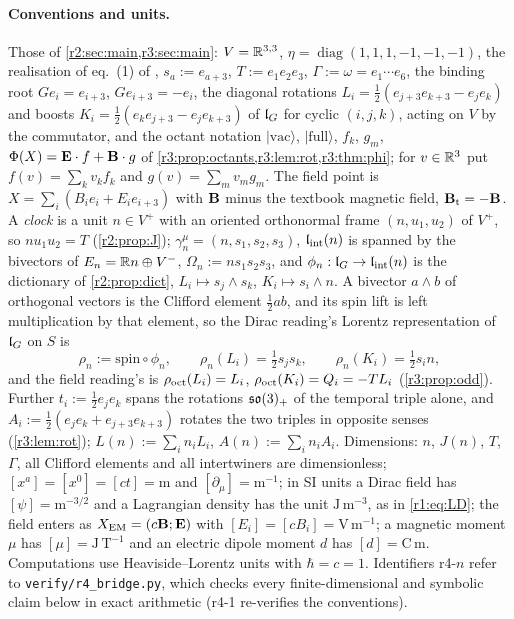 \paragraph{Conventions and units.} Those of \cref{r2:sec:main,r3:sec:main}: $V=\mathbb{R}^{3,3}$, $\eta=\operatorname{diag}(1,1,1,-1,-1,-1)$, the
realisation of eq.~(1) of \cite{ES17}, $s_a:=e_{a+3}$, $T:=e_1e_2e_3$, $\Gamma:=\omega=e_1\cdots e_6$, the binding root $Ge_i=e_{i+3}$,
$Ge_{i+3}=-e_i$, the diagonal rotations $L_i=\tfrac12(e_{j+3}e_{k+3}-e_je_k)$ and boosts $K_i=\tfrac12(e_ke_{j+3}-e_je_{k+3})$ of $\mathfrak l_G$ for cyclic
$(i,j,k)$, acting on $V$ by the commutator, and the octant notation $|\mathrm{vac}\rangle$, $|\mathrm{full}\rangle$, $f_k$, $g_m$, $\Phi(X)=\mathbf E\cdot f+\mathbf B\cdot g$ of
\cref{r3:prop:octants,r3:lem:rot,r3:thm:phi}; for $v\in\mathbb{R}^3$ put $f(v)=\sum_kv_kf_k$ and $g(v)=\sum_mv_mg_m$. The field point is
$X=\sum_i(B_ie_i+E_ie_{i+3})$ with $\mathbf B$ minus the textbook magnetic field, $\mathbf B_{\rm t}=-\mathbf B$. A \emph{clock} is a unit $n\in V^+$ with an oriented
orthonormal frame $(n,u_1,u_2)$ of $V^+$, so $nu_1u_2=T$ (\cref{r2:prop:J}); $\gamma^\mu_n=(n,s_1,s_2,s_3)$, $\mathfrak l_{\rm int}(n)$ is spanned by the
bivectors of $E_n=\mathbb{R} n\oplus V^-$, $\Omega_n:=ns_1s_2s_3$, and $\phi_n:\mathfrak l_G\to\mathfrak l_{\rm int}(n)$ is the dictionary of \cref{r2:prop:dict},
$L_i\mapsto s_j\wedge s_k$, $K_i\mapsto s_i\wedge n$. A bivector $a\wedge b$ of orthogonal vectors is the Clifford element $\tfrac12ab$, and its spin
lift is left multiplication by that element, so the Dirac reading's Lorentz representation of $\mathfrak l_G$ on $S$ is
\[
\rho_n:=\text{spin}\circ\phi_n,\qquad \rho_n(L_i)=\tfrac12s_js_k,\qquad \rho_n(K_i)=\tfrac12s_in ,
\]
and the field reading's is $\rho_{\rm oct}(L_i)=L_i$, $\rho_{\rm oct}(K_i)=Q_i=-TL_i$ (\cref{r3:prop:odd}). Further $t_i:=\tfrac12e_je_k$ spans the
rotations $\mathfrak{so}(3)_+$ of the temporal triple alone, and $A_i:=\tfrac12(e_je_k+e_{j+3}e_{k+3})$ rotates the two triples in opposite senses
(\cref{r3:lem:rot}); $L(n):=\sum_in_iL_i$, $A(n):=\sum_in_iA_i$. Dimensions: $n$, $J(n)$, $T$, $\Gamma$, all Clifford elements and all
intertwiners are dimensionless; $[x^a]=[x^0]=[ct]=\mathrm m$ and $[\partial_\mu]=\mathrm m^{-1}$; in SI units a Dirac field has $[\psi]=\mathrm m^{-3/2}$ and
a Lagrangian density has the unit $\mathrm{J\,m^{-3}}$, as in \cref{r1:eq:LD}; the field enters as $X_{\rm EM}=(c\mathbf B;\mathbf E)$ with $[E_i]=[cB_i]=\mathrm{V\,m^{-1}}$; a
magnetic moment $\mu$ has $[\mu]=\mathrm{J\,T^{-1}}$ and an electric dipole moment $d$ has $[d]=\mathrm{C\,m}$. Computations use Heaviside--Lorentz units
with $\hbar=c=1$. Identifiers r4-$n$ refer to \texttt{verify/r4\_bridge.py}, which checks every finite-dimensional and symbolic claim below
in exact arithmetic (r4-1 re-verifies the conventions).

